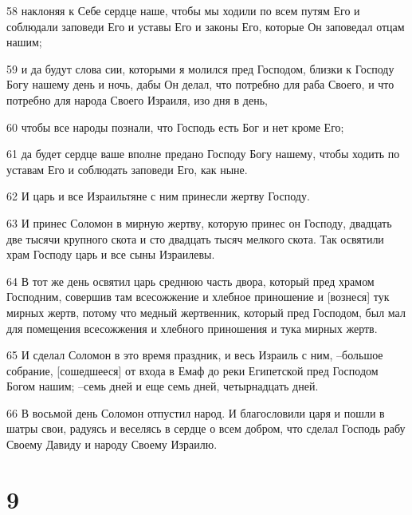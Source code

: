 \par 58 наклоняя к Себе сердце наше, чтобы мы ходили по всем путям Его и соблюдали заповеди Его и уставы Его и законы Его, которые Он заповедал отцам нашим;
\par 59 и да будут слова сии, которыми я молился пред Господом, близки к Господу Богу нашему день и ночь, дабы Он делал, что потребно для раба Своего, и что потребно для народа Своего Израиля, изо дня в день,
\par 60 чтобы все народы познали, что Господь есть Бог и нет кроме Его;
\par 61 да будет сердце ваше вполне предано Господу Богу нашему, чтобы ходить по уставам Его и соблюдать заповеди Его, как ныне.
\par 62 И царь и все Израильтяне с ним принесли жертву Господу.
\par 63 И принес Соломон в мирную жертву, которую принес он Господу, двадцать две тысячи крупного скота и сто двадцать тысяч мелкого скота. Так освятили храм Господу царь и все сыны Израилевы.
\par 64 В тот же день освятил царь среднюю часть двора, который пред храмом Господним, совершив там всесожжение и хлебное приношение и [вознеся] тук мирных жертв, потому что медный жертвенник, который пред Господом, был мал для помещения всесожжения и хлебного приношения и тука мирных жертв.
\par 65 И сделал Соломон в это время праздник, и весь Израиль с ним, --большое собрание, [сошедшееся] от входа в Емаф до реки Египетской пред Господом Богом нашим; --семь дней и еще семь дней, четырнадцать дней.
\par 66 В восьмой день Соломон отпустил народ. И благословили царя и пошли в шатры свои, радуясь и веселясь в сердце о всем добром, что сделал Господь рабу Своему Давиду и народу Своему Израилю.

\chapter{9}

